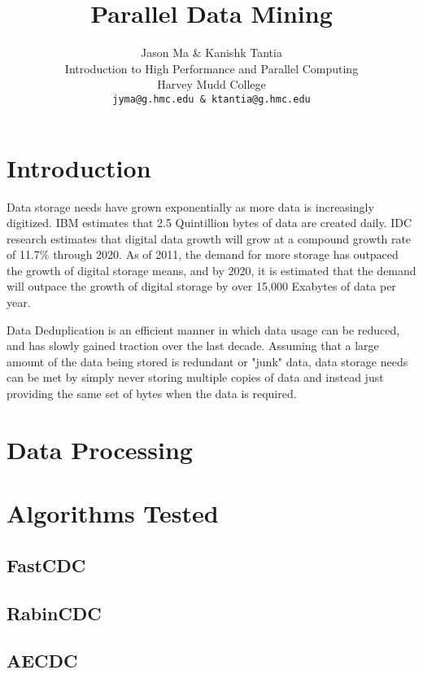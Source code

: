 \documentclass{article}
\title{Parallel Data Mining}
\author{
	Jason Ma \& Kanishk Tantia\\
	Introduction to High Performance and Parallel Computing \\
	Harvey Mudd College \\
	\texttt{jyma@g.hmc.edu \& ktantia@g.hmc.edu}   
	}
\begin{document}
	\maketitle
	\begin{abstract}

	\end{abstract}
	
	\section{Introduction}	
		
	Data storage needs have grown exponentially as more data is increasingly digitized. IBM estimates that 2.5 Quintillion bytes of data are created daily. IDC research estimates that digital data growth will grow at a compound growth rate of 11.7\% through 2020. As of 2011, the demand for more storage has outpaced the growth of digital storage means, and by 2020, it is estimated that the demand will outpace the growth of digital storage by over 15,000 Exabytes of data per year. 
	
	Data Deduplication is an efficient manner in which data usage can be reduced, and has slowly gained traction over the last decade. Assuming that a large amount of the data being stored is redundant or "junk" data, data storage needs can be met by simply never storing multiple copies of data and instead just providing the same set of bytes when the data is required. 
	
	

	\section{Data Processing}

	
	\section{Algorithms Tested}

	\subsection{FastCDC}
	
	\subsection{RabinCDC}
	
	\subsection{AECDC}	
	
\end{document}
